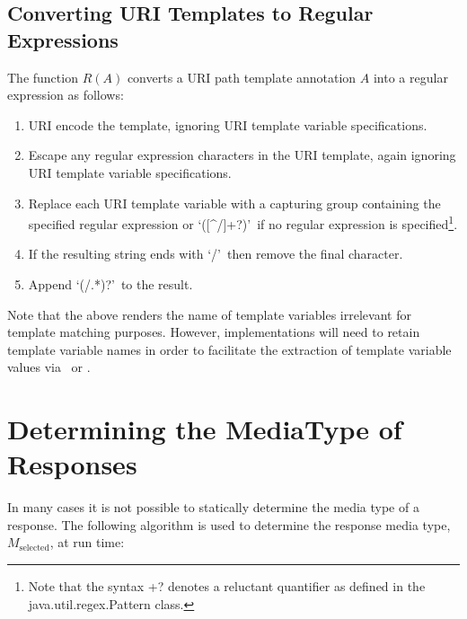 \subsection{Converting URI Templates to Regular Expressions}
\label{template_to_regex}

The function $R(A)$ converts a URI path template annotation $A$ into a regular expression as follows:
\begin{enumerate}
\item URI encode the template, ignoring URI template variable specifications.
\item Escape any regular expression characters in the URI template, again ignoring URI template variable specifications.
\item Replace each URI template variable with a capturing group containing the specified regular expression or \lq([\^{ }/]+?)\rq\ if no regular expression is specified\footnote{Note that the syntax +? denotes a reluctant quantifier as defined in the java.util.regex.Pattern class.}.
\item If the resulting string ends with \lq/\rq\ then remove the final character.
\item Append \lq(/.*)?\rq\ to the result.
\end{enumerate}

Note that the above renders the name of template variables irrelevant for template matching purposes. However, implementations will need to retain template variable names in order to facilitate the extraction of template variable values via \PathParam\ or \UriInfo{}.

\section{Determining the MediaType of Responses}
\label{determine_response_type}

In many cases it is not possible to statically determine the media type of a response. The following algorithm is used to determine the response media type, $M_{\mbox{selected}}$, at run time:

